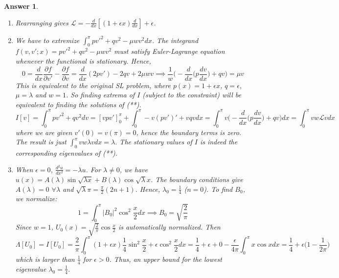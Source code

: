 \documentclass[a4paper]{article}
\newtheorem{ans}{Answer}[section]
\theoremstyle{new}
\begin{document}
\begin{ans}\leavevmode
\begin{enumerate}[label=(\roman*)]
\item Rearranging gives $\mathcal{L}=-\frac{d}{dx}[(1+\epsilon x)\frac{d}{dx}]+\epsilon$.
\item We have to extremize $\int_0^\pi pv'^2+qv^2-\mu wv^2dx$. The integrand $f(v,v';x)=pv'^2+qv^2-\mu wv^2$ must satisfy Euler-Lagrange equation whenever the functional is stationary. Hence,
$$0=\frac{d}{dx}\frac{\partial f}{\partial v'}-\frac{\partial f}{\partial v}=\frac{d}{dx}(2pv')-2qv+2\mu wv\implies\frac{1}{w}\bigg(-\frac{d}{dx}\bigg(p\frac{dv}{dx}\bigg)+qv\bigg)=\mu v$$
This is equivalent to the original SL problem, where $p(x)=1+\epsilon x$, $q=\epsilon$, $\mu=\lambda$ and $w=1$. So finding extrema of $I$ (subject to the constraint) will be equivalent to finding the solutions of (**). 
$$I[v]=\int_0^\pi pv'^2+qv^2dv=[vpv']_0^\pi+\int_0^\pi-v(pv')'+vqvdx=\int_0^\pi v\bigg(-\frac{d}{dx}\bigg(p\frac{dv}{dx}\bigg)+qv\bigg)dx=\int_0^\pi vw\mathcal{L}vdx$$
where we are given $v'(0)=v(\pi)=0$, hence the boundary terms is zero. The result is just $\int_0^\pi vw\lambda vdx=\lambda$. 
The stationary values of $I$ is indeed the corresponding eigenvalues of (**).
\item When $\epsilon=0$, $\frac{d^2u}{dx^2}=-\lambda u$. For $\lambda\neq 0$, we have $u(x)=A(\lambda)\sin\sqrt{\lambda x}+B(\lambda)\cos\sqrt{\lambda}x$. The boundary conditions give $A(\lambda)=0$ $\forall\lambda$ and $\sqrt{\lambda}\pi=\frac{\pi}{2}(2n+1)$. Hence, $\lambda_0=\frac{1}{4}$ ($n=0$). To find $B_0$, we normalize:
$$1=\int_0^\pi|B_0|^2\cos^2\frac{x}{2}dx\implies B_0=\sqrt{\frac{2}{\pi}}$$
Since $w=1$, $U_0(x)=\sqrt{\frac{2}{\pi}}\cos\frac{x}{2}$ is automatically normalized. Then
$$\Lambda[U_0]=I[U_0]=\frac{2}{\pi}\int_0^\pi(1+\epsilon x)\frac{1}{4}\sin^2\frac{x}{2}+\epsilon\cos^2\frac{x}{2}dx=\frac{1}{4}+\epsilon+0-\frac{\epsilon}{4\pi}\int_0^\pi x\cos xdx=\frac{1}{4}+\epsilon\bigg(1-\frac{1}{2\pi}\bigg)$$
which is larger than $\frac{1}{4}$ for $\epsilon>0$. Thus, an upper bound for the lowest eigenvalue $\lambda_0=\frac{1}{4}$.
\end{enumerate}
\end{ans}
\newpage
\end{document}
